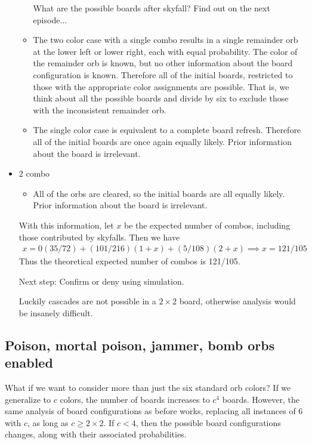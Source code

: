 \documentclass[12pt]{article}
\theoremstyle{definition}
\begin{document}
\begin{itemize}
\begin{itemize}
        What are the possible boards after skyfall? Find out on the next episode...
        \item 
        The two color case with a single combo results in a single remainder orb at the lower left or lower right, each with equal probability. The color of the remainder orb is known, but no other information about the board configuration is known. Therefore all of the initial boards, restricted to those with the appropriate color assignments are possible. That is, we think about all the possible boards and divide by six to exclude those with the inconsistent remainder orb.
        \item The single color case is equivalent to a complete board refresh. Therefore all of the initial boards are once again equally likely. Prior information about the board is irrelevant.
    \end{itemize}
    \item 2 combo
    \begin{itemize}
        \item All of the orbs are cleared, so the initial boards are all equally likely. Prior information about the board is irrelevant.
    \end{itemize}
With this information, let $x$ be the expected number of combos, including those contributed by skyfalls. Then we have
\begin{align*}
    x = 0(35/72) + (101/216)(1+x) + (5/108)(2+x)
    \implies x = 121/105
\end{align*}
Thus the theoretical expected number of combos is 121/105.

Next step: Confirm or deny using simulation.

Luckily cascades are not possible in a $2\times 2$ board, otherwise analysis would be insanely difficult.
\end{itemize}
\subsection{Poison, mortal poison, jammer, bomb orbs enabled}
What if we want to consider more than just the six standard orb colors? If we generalize to $c$ colors, the number of boards increases to $c^4$ boards. However, the same analysis of board configurations as before works, replacing all instances of 6 with $c$, as long as $c\geq 2\times 2$. If $c<4$, then the possible board configurations changes, along with their associated probabilities.
\end{document}
